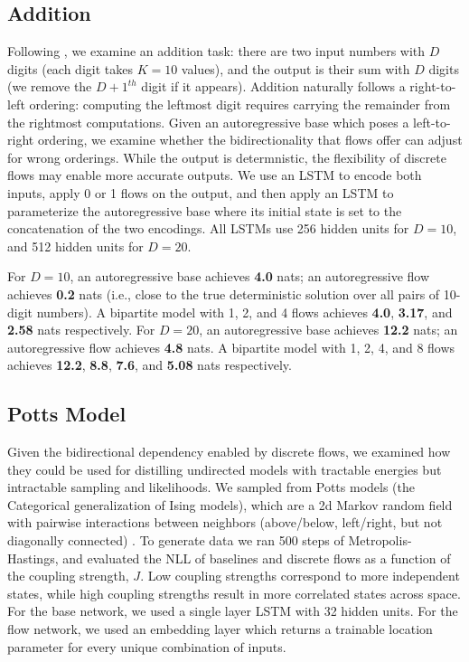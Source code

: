 \documentclass{article}
\begin{document}
\subsection{Addition}
Following \citet{zaremba2014learning}, we examine an addition task: there are two input numbers with $D$ digits (each digit takes $K=10$ values), and the output is their sum with $D$ digits (we remove the $D+1^{th}$ digit if it appears).
Addition naturally follows a right-to-left ordering: computing the leftmost digit requires carrying the remainder from the rightmost computations.
Given an autoregressive base which poses a left-to-right ordering, we examine whether the bidirectionality that flows offer can adjust for wrong orderings. While the output is determnistic, the flexibility of discrete flows may enable more accurate outputs.
We use an LSTM to encode both inputs, apply 0 or 1 flows on the output, and then apply an LSTM to parameterize the autoregressive base where its initial state is set to the concatenation of the two encodings. All LSTMs use 256 hidden units for $D=10$, and 512 hidden units for $D=20$.

For $D=10$, an autoregressive base achieves \textbf{4.0} nats;
an autoregressive flow achieves \textbf{0.2} nats (i.e., close to the true deterministic solution over all pairs of 10-digit numbers). A bipartite model with 1, 2, and 4 flows achieves \textbf{4.0}, \textbf{3.17}, and \textbf{2.58} nats respectively.
For $D=20$, an autoregressive base achieves \textbf{12.2} nats;
an autoregressive flow achieves \textbf{4.8} nats. A bipartite model with 1, 2, 4, and 8 flows achieves \textbf{12.2}, \textbf{8.8}, \textbf{7.6}, and \textbf{5.08} nats respectively.

\subsection{Potts Model}
Given the bidirectional dependency enabled by discrete flows, we examined how they could be used for distilling undirected models with tractable energies but intractable sampling and likelihoods. We sampled from Potts models (the Categorical generalization of Ising models), which are a 2d Markov random field with pairwise interactions between neighbors (above/below, left/right, but not diagonally connected) \citep{wu1982potts}. To generate data we ran 500 steps of Metropolis-Hastings, and evaluated the NLL of baselines and discrete flows as a function of the coupling strength, $J$. Low coupling strengths correspond to more independent states, while high coupling strengths result in more correlated states across space. For the base network, we used a single layer LSTM with 32 hidden units. For the flow network, we used an embedding layer which returns a trainable location parameter for every unique combination of inputs.
\end{document}
